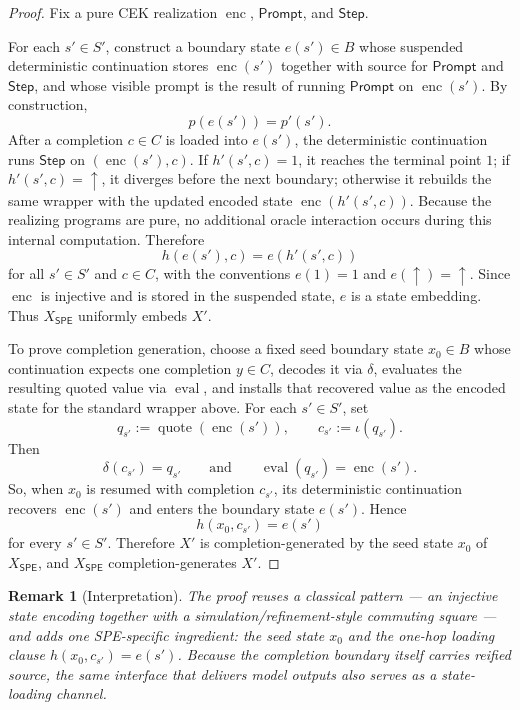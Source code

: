 \documentclass[11pt]{article}
\newtheorem{remark}[definition]{Remark}
\newcommand{\SPE}{\mathsf{SPE}}
\newcommand{\eval}{\operatorname{eval}}
\newcommand{\quoteop}{\operatorname{quote}}
\newcommand{\enc}{\operatorname{enc}}
\begin{document}
\begin{proof}
Fix a pure CEK realization $\enc$, $\mathsf{Prompt}$, and $\mathsf{Step}$.

For each $s'\in S'$, construct a boundary state $e(s')\in B$ whose suspended deterministic continuation stores $\enc(s')$ together with source for $\mathsf{Prompt}$ and $\mathsf{Step}$, and whose visible prompt is the result of running $\mathsf{Prompt}$ on $\enc(s')$. By construction,
\[
p(e(s'))=p'(s').
\]
After a completion $c\in C$ is loaded into $e(s')$, the deterministic continuation runs $\mathsf{Step}$ on $(\enc(s'),c)$. If $h'(s',c)=1$, it reaches the terminal point $1$; if $h'(s',c)=\uparrow$, it diverges before the next boundary; otherwise it rebuilds the same wrapper with the updated encoded state $\enc(h'(s',c))$. Because the realizing programs are pure, no additional oracle interaction occurs during this internal computation. Therefore
\[
h(e(s'),c)=e(h'(s',c))
\]
for all $s'\in S'$ and $c\in C$, with the conventions $e(1)=1$ and $e(\uparrow)=\uparrow$. Since $\enc$ is injective and is stored in the suspended state, $e$ is a state embedding. Thus $X_{\SPE}$ uniformly embeds $X'$.

To prove completion generation, choose a fixed seed boundary state $x_0\in B$ whose continuation expects one completion $y\in C$, decodes it via $\delta$, evaluates the resulting quoted value via $\eval$, and installs that recovered value as the encoded state for the standard wrapper above. For each $s'\in S'$, set
\[
q_{s'}:=\quoteop(\enc(s')),
\qquad
c_{s'}:=\iota(q_{s'}).
\]
Then
\[
\delta(c_{s'})=q_{s'}
\qquad\text{and}\qquad
\eval(q_{s'})=\enc(s').
\]
So, when $x_0$ is resumed with completion $c_{s'}$, its deterministic continuation recovers $\enc(s')$ and enters the boundary state $e(s')$. Hence
\[
h(x_0,c_{s'})=e(s')
\]
for every $s'\in S'$. Therefore $X'$ is completion-generated by the seed state $x_0$ of $X_{\SPE}$, and $X_{\SPE}$ completion-generates $X'$.
\end{proof}

\begin{remark}[Interpretation]
The proof reuses a classical pattern --- an injective state encoding together with a simulation/refinement-style commuting square \cite{AbadiLamport91,LynchVaandrager95,SegalaLynch95} --- and adds one SPE-specific ingredient: the seed state $x_0$ and the one-hop loading clause $h(x_0,c_{s'})=e(s')$. Because the completion boundary itself carries reified source, the same interface that delivers model outputs also serves as a state-loading channel.
\end{remark}
\end{document}
